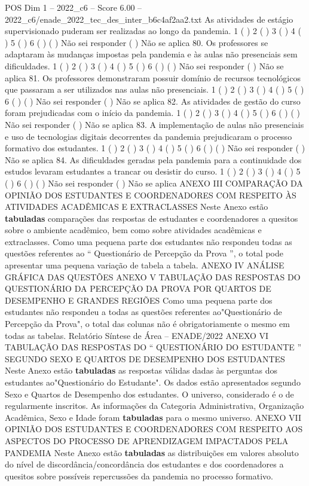 \begin{textsample}{POS Dim 1 – 2022\_c6 – Score 6.00 – 2022\_c6/enade\_2022\_tec\_des\_inter\_b6c4af2aa2.txt}
As atividades de estágio supervisionado puderam ser realizadas ao longo da pandemia. 1 ( ) 2 ( ) 3 ( ) 4 ( ) 5 ( ) 6 ( ) ( ) Não sei responder ( ) Não se aplica 80.
Os professores se adaptaram às mudanças impostas pela pandemia e às aulas não presenciais sem dificuldades. 1 ( ) 2 ( ) 3 ( ) 4 ( ) 5 ( ) 6 ( ) ( ) Não sei responder ( ) Não se aplica 81.
Os professores demonstraram possuir domínio de recursos tecnológicos que passaram a ser utilizados nas aulas não presenciais. 1 ( ) 2 ( ) 3 ( ) 4 ( ) 5 ( ) 6 ( ) ( ) Não sei responder ( ) Não se aplica 82.
As atividades de gestão do curso foram prejudicadas com o início da pandemia. 1 ( ) 2 ( ) 3 ( ) 4 ( ) 5 ( ) 6 ( ) ( ) Não sei responder ( ) Não se aplica 83.
A implementação de aulas não presenciais e uso de tecnologias digitais decorrentes da pandemia prejudicaram o processo formativo dos estudantes. 1 ( ) 2 ( ) 3 ( ) 4 ( ) 5 ( ) 6 ( ) ( ) Não sei responder ( ) Não se aplica 84.
As dificuldades geradas pela pandemia para a continuidade dos estudos levaram estudantes a trancar ou desistir do curso. 1 ( ) 2 ( ) 3 ( ) 4 ( ) 5 ( ) 6 ( ) ( ) Não sei responder ( ) Não se aplica ANEXO III COMPARAÇÃO DA OPINIÃO DOS ESTUDANTES E COORDENADORES COM RESPEITO ÀS ATIVIDADES ACADÊMICAS E EXTRACLASSES Neste Anexo estão \textbf{tabuladas} comparações das respostas de estudantes e coordenadores a quesitos sobre o ambiente acadêmico, bem como sobre atividades acadêmicas e extraclasses.
Como uma pequena parte dos estudantes não respondeu todas as questões referentes ao “ Questionário de Percepção da Prova ”, o total pode apresentar uma pequena variação de tabela a tabela.
ANEXO IV ANÁLISE GRÁFICA DAS QUESTÕES ANEXO V TABULAÇÃO DAS RESPOSTAS DO QUESTIONÁRIO DA PERCEPÇÃO DA PROVA POR QUARTOS DE DESEMPENHO E GRANDES REGIÕES Como uma pequena parte dos estudantes não respondeu a todas as questões referentes ao"Questionário de Percepção da Prova", o total das colunas não é obrigatoriamente o mesmo em todas as tabelas.
Relatório Síntese de Área – ENADE/2022 ANEXO VI TABULAÇÃO DAS RESPOSTAS DO “ QUESTIONÁRIO DO ESTUDANTE ” SEGUNDO SEXO E QUARTOS DE DESEMPENHO DOS ESTUDANTES Neste Anexo estão \textbf{tabuladas} as respostas válidas dadas às perguntas dos estudantes ao"Questionário do Estudante".
Os dados estão apresentados segundo Sexo e Quartos de Desempenho dos estudantes.
O universo, considerado é o de regularmente inscritos.
As informações da Categoria Administrativa, Organização Acadêmica, Sexo e Idade foram \textbf{tabuladas} para o mesmo universo.
ANEXO VII OPINIÃO DOS ESTUDANTES E COORDENADORES COM RESPEITO AOS ASPECTOS DO PROCESSO DE APRENDIZAGEM IMPACTADOS PELA PANDEMIA Neste Anexo estão \textbf{tabuladas} as distribuições em valores absoluto do nível de discordância/concordância dos estudantes e dos coordenadores a quesitos sobre possíveis repercussões da pandemia no processo formativo.

\end{textsample}
